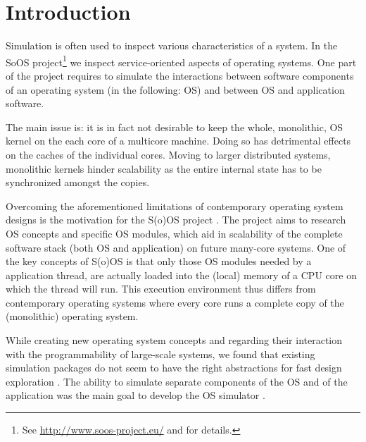 \section{Introduction}

Simulation is often used to inspect various characteristics of a system.
In the SoOS project\footnote{See \url{http://www.soos-project.eu/} and \cite{soos} for details.} we inspect service-oriented aspects of operating systems.
One part of the project requires to simulate the interactions between software components of an operating system (in the following: OS) and between
OS and application software.

The main issue is: it is in fact not desirable to keep the whole, monolithic, OS kernel on the each core of a multicore machine.
Doing so has detrimental effects on the caches of the individual cores.
Moving to larger distributed systems, monolithic kernels hinder scalability as the entire internal state has to be synchronized amongst the copies.

Overcoming the aforementioned limitations of contemporary operating system designs is the motivation for the S(o)OS project \cite{soos}.
The project aims to research OS concepts and specific OS modules, which aid in scalability of the complete software stack (both OS and application) on future many-core systems.
One of the key concepts of S(o)OS is that only those OS modules needed by a application thread, are actually loaded into the (local) memory of a CPU core on which the thread will run.
This execution environment thus differs from contemporary operating systems where every core runs a complete copy of the (monolithic) operating system.

While creating new operating system concepts and regarding their interaction with the programmability of large-scale systems, we found that existing simulation packages do not seem to have the right abstractions for fast design exploration \cite{cotson,omnet}.
The ability to simulate separate components of the OS and of the application was the main goal to develop the OS simulator \soosim {}.

